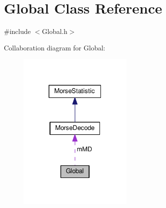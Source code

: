 \hypertarget{classGlobal}{}\section{Global Class Reference}
\label{classGlobal}


{\ttfamily \#include $<$Global.\+h$>$}



Collaboration diagram for Global\+:\nopagebreak
\begin{figure}[H]
\begin{center}
\leavevmode
\includegraphics[width=160pt]{classGlobal__coll__graph}
\end{center}
\end{figure}
